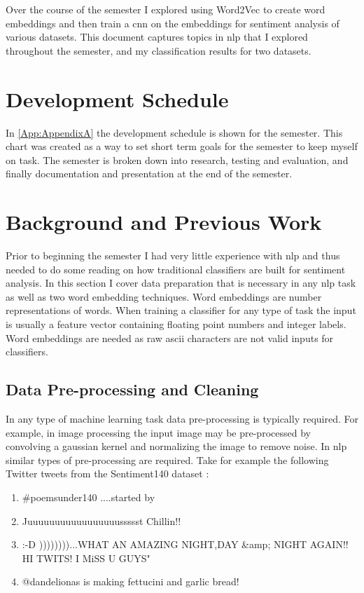 \documentclass[12pt]{article}
\begin{document}
Over the course of the semester I explored using Word2Vec \cite{word2vec} to create word embeddings and then train a \ac{cnn} on the embeddings for sentiment analysis of various datasets. This document captures topics in \ac{nlp} that I explored throughout the semester, and my classification results for two datasets.

\section{Development Schedule}

In \cref{App:AppendixA} the development schedule is shown for the semester. This chart was created as a way to set short term goals for the semester to keep myself on task. The semester is broken down into research, testing and evaluation, and finally documentation and presentation at the end of the semester. 

\section {Background and Previous Work} \label{background}
Prior to beginning the semester I had very little experience with \ac{nlp} and thus needed to do some reading on how traditional classifiers are built for sentiment analysis. In this section I cover data preparation that is necessary in any \ac{nlp} task as well as two word embedding techniques. Word embeddings are number representations of words. When training a classifier for any type of task the input is usually a feature vector containing floating point numbers and integer labels. Word embeddings are needed as raw ascii characters are not valid inputs for classifiers.

\subsection {Data Pre-processing and Cleaning}
In any type of machine learning task data pre-processing is typically required. For example, in image processing the input image may be pre-processed by convolving a gaussian kernel and normalizing the image to remove noise. In \ac{nlp} similar types of pre-processing are required. Take for example the following Twitter tweets from the Sentiment140 dataset \cite{sentiment140}:

\begin{enumerate}
	\item \#poemsunder140 ....started by 
	\item Juuuuuuuuuuuuuuuuussssst Chillin!!
	\item :-D ))))))))...WHAT AN AMAZING NIGHT,DAY \&amp; NIGHT AGAIN!! HI TWITS! I MiSS U GUYS"
	\item @dandelionas is making fettucini and garlic bread!
\end{enumerate} 
\end{document}
